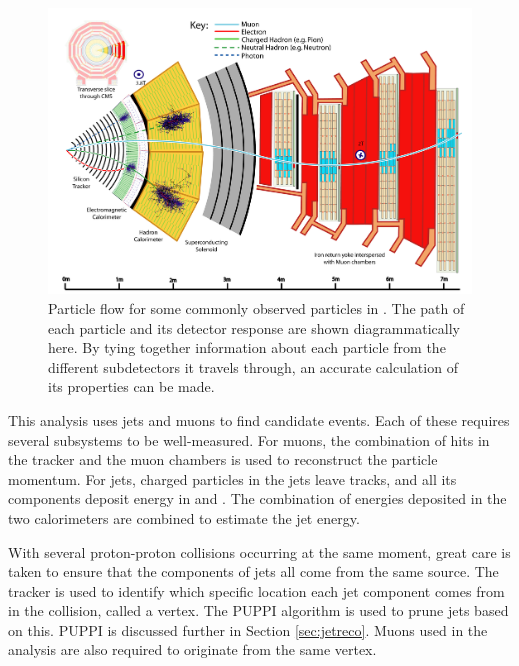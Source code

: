 \begin{figure}[!tp]
    \centering
    \includegraphics[width=\textwidth]{figures/particle_flow_detector.pdf}
    \caption[
       Particle Flow in CMS.
    ]{
        Particle flow for some commonly observed particles in \CMS. The path of each particle and its detector response are shown diagrammatically here. By tying together information about each particle from the different subdetectors it travels through, an accurate calculation of its properties can be made.
    }
    \label{fig:particle_flow_cms}
\end{figure}

This analysis uses jets and muons to find candidate \WR events. Each of these requires several subsystems to be well-measured. For muons, the combination of hits in the tracker and the muon chambers is used to reconstruct the particle momentum. For jets, charged particles in the jets leave tracks, and all its components deposit energy in \ECAL and \HCAL. The combination of energies deposited in the two calorimeters are combined to estimate the jet energy.

With several proton-proton collisions occurring at the same moment, great care is taken to ensure that the components of jets all come from the same source. The tracker is used to identify which specific location each jet component comes from in the collision, called a vertex. The PUPPI algorithm is used to prune jets based on this. PUPPI is discussed further in Section \ref{sec:jetreco}. Muons used in the analysis are also required to originate from the same vertex. 


